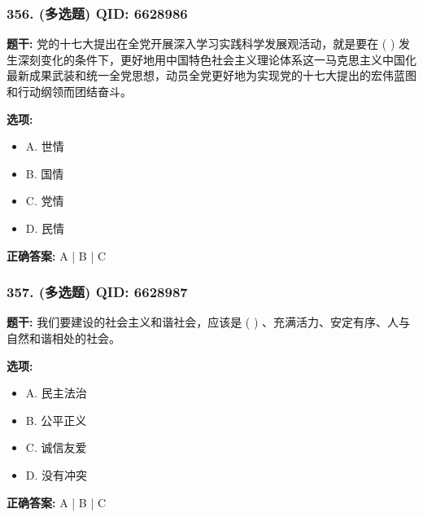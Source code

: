 \documentclass[12pt,UTF8]{ctexart}
\begin{document}
\subsubsection*{356. (多选题) \small QID: 6628986}

\textbf{题干:}
党的十七大提出在全党开展深入学习实践科学发展观活动，就是要在  ( )  发生深刻变化的条件下，更好地用中国特色社会主义理论体系这一马克思主义中国化最新成果武装和统一全党思想，动员全党更好地为实现党的十七大提出的宏伟蓝图和行动纲领而团结奋斗。

\textbf{选项:}
\begin{itemize}[leftmargin=*]

  \item A. 世情

  \item B. 国情

  \item C. 党情

  \item D. 民情

\end{itemize}

\textbf{正确答案:}
A | B | C

\vspace{0.3em}\hrulefill\vspace{0.7em}

\subsubsection*{357. (多选题) \small QID: 6628987}

\textbf{题干:}
我们要建设的社会主义和谐社会，应该是  ( )  、充满活力、安定有序、人与自然和谐相处的社会。

\textbf{选项:}
\begin{itemize}[leftmargin=*]

  \item A. 民主法治

  \item B. 公平正义

  \item C. 诚信友爱

  \item D. 没有冲突

\end{itemize}

\textbf{正确答案:}
A | B | C

\vspace{0.3em}\hrulefill\vspace{0.7em}
\end{document}
